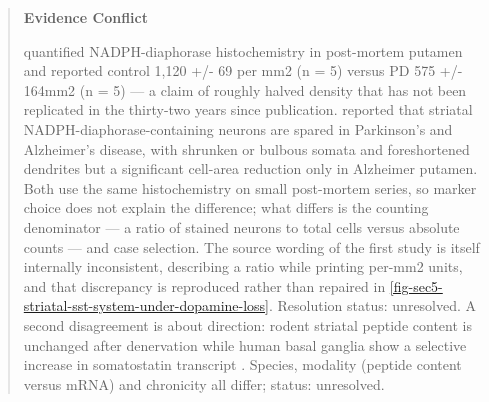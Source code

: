 \documentclass[11pt]{article}
\begin{document}
\begin{quote}
\noindent\textbf{Evidence Conflict}\par
\citet{Bockelmann1994} quantified NADPH-diaphorase histochemistry in post-mortem putamen and reported control 1,120 +/- 69 per mm2 (n = 5) versus PD 575 +/- 164mm2 (n = 5) --- a claim of roughly halved density that has not been replicated in the thirty-two years since publication. \citet{Mufson1994} reported that striatal NADPH-diaphorase-containing neurons are spared in Parkinson's and Alzheimer's disease, with shrunken or bulbous somata and foreshortened dendrites but a significant cell-area reduction only in Alzheimer putamen. Both use the same histochemistry on small post-mortem series, so marker choice does not explain the difference; what differs is the counting denominator --- a ratio of stained neurons to total cells versus absolute counts --- and case selection. The source wording of the first study is itself internally inconsistent, describing a ratio while printing per-mm2 units, and that discrepancy is reproduced rather than repaired in \ref{fig-sec5-striatal-sst-system-under-dopamine-loss}. Resolution status: unresolved. A second disagreement is about direction: rodent striatal peptide content is unchanged after denervation \citep{Salin1990} while human basal ganglia show a selective increase in somatostatin transcript \citep{Eve1997}. Species, modality (peptide content versus mRNA) and chronicity all differ; status: unresolved.

\end{quote}
\end{document}
